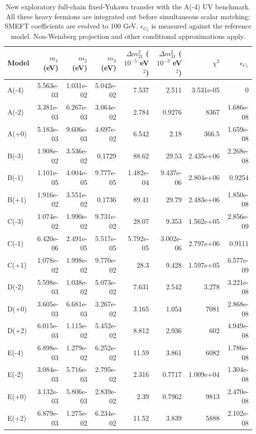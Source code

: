 \begin{table}[htbp]
\centering
\small
\setlength{\tabcolsep}{3.4pt}
\begin{tabular}{lrrrrrrr}
\hline
Model & $m_1$ (eV) & $m_2$ (eV) & $m_3$ (eV) & $\Delta m^2_{21}$ ($10^{-5}$ eV$^2$) & $\Delta m^2_{31}$ ($10^{-3}$ eV$^2$) & $\chi^2$ & $\epsilon_{C_5}$ \\
\hline
A(-4) & 5.563e-03 & 1.031e-02 & 5.042e-02 & 7.537 & 2.511 & 3.531e-05 & 0 \\
A(-2) & 3.381e-03 & 6.267e-03 & 3.064e-02 & 2.784 & 0.9276 & 8367 & 1.686e-08 \\
A(+0) & 5.183e-03 & 9.606e-03 & 4.697e-02 & 6.542 & 2.18 & 366.5 & 1.659e-08 \\
B(-3) & 1.908e-02 & 3.536e-02 & 0.1729 & 88.62 & 29.53 & 2.435e+06 & 2.268e-08 \\
B(-1) & 1.101e-05 & 4.004e-05 & 9.777e-05 & 1.482e-04 & 9.437e-06 & 2.804e+06 & 0.9254 \\
B(+1) & 1.916e-02 & 3.551e-02 & 0.1736 & 89.41 & 29.79 & 2.483e+06 & 1.850e-08 \\
C(-3) & 1.074e-02 & 1.990e-02 & 9.731e-02 & 28.07 & 9.353 & 1.562e+05 & 2.856e-09 \\
C(-1) & 6.420e-06 & 2.491e-05 & 5.517e-05 & 5.792e-05 & 3.002e-06 & 2.797e+06 & 0.9111 \\
C(+1) & 1.078e-02 & 1.998e-02 & 9.770e-02 & 28.3 & 9.428 & 1.597e+05 & 6.577e-09 \\
D(-2) & 5.598e-03 & 1.038e-02 & 5.073e-02 & 7.631 & 2.542 & 3.278 & 3.221e-08 \\
D(+0) & 3.605e-03 & 6.681e-03 & 3.267e-02 & 3.165 & 1.054 & 7081 & 2.868e-08 \\
D(+2) & 6.015e-03 & 1.115e-02 & 5.452e-02 & 8.812 & 2.936 & 602 & 4.949e-08 \\
E(-4) & 6.898e-03 & 1.279e-02 & 6.252e-02 & 11.59 & 3.861 & 6082 & 1.786e-08 \\
E(-2) & 3.084e-03 & 5.716e-03 & 2.795e-02 & 2.316 & 0.7717 & 1.009e+04 & 1.304e-08 \\
E(+0) & 3.132e-03 & 5.806e-03 & 2.839e-02 & 2.39 & 0.7962 & 9813 & 2.470e-08 \\
E(+2) & 6.879e-03 & 1.275e-02 & 6.234e-02 & 11.52 & 3.839 & 5888 & 2.102e-08 \\
\hline
\end{tabular}
\caption{New exploratory full-chain fixed-Yukawa transfer with the A(-4) UV benchmark. All three heavy fermions are integrated out before simultaneous scalar matching; SMEFT coefficients are evolved to 100 GeV. $\epsilon_{C_5}$ is measured against the reference model. Non-Weinberg projection and other conditional approximations apply.}
\label{tab:generalised_b2}
\end{table}
